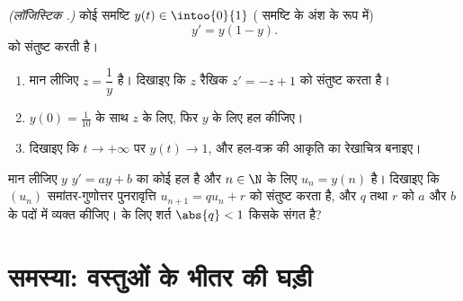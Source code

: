 \begin{exercise}[$\star\star\star$]\label{exo:g12:diffeq:8}
\emph{(लॉजिस्टिक .)} कोई समष्टि $y(t) \in \intoo{0}{1}$ ( समष्टि के अंश के रूप में)
\[
y' = y(1 - y).
\]
को संतुष्ट करती है।
\begin{enumerate}
  \item मान लीजिए $z = \dfrac{1}{y}$ है। दिखाइए कि $z$ रैखिक  $z' = -z + 1$ को संतुष्ट
        करता है।
  \item $y(0) = \frac{1}{10}$ के साथ $z$ के लिए, फिर $y$ के लिए हल कीजिए।
  \item दिखाइए कि $t \to +\infty$ पर $y(t) \to 1$, और हल-वक्र की आकृति का रेखाचित्र बनाइए।
\end{enumerate}
\end{exercise}

\begin{exercise}[$\star\star\star$]\label{exo:g12:diffeq:9}
मान लीजिए $y$ $y' = ay + b$ का कोई हल है और $n \in \N$ के लिए $u_n = y(n)$ है। दिखाइए कि $(u_n)$
समांतर-गुणोत्तर पुनरावृत्ति $u_{n+1} = q u_n + r$ को संतुष्ट करता है, और $q$ तथा $r$ को
$a$ और $b$ के पदों में व्यक्त कीजिए।  के लिए शर्त $\abs{q} < 1$ किसके
संगत है?
\end{exercise}

\section{समस्या: वस्तुओं के भीतर की घड़ी}

